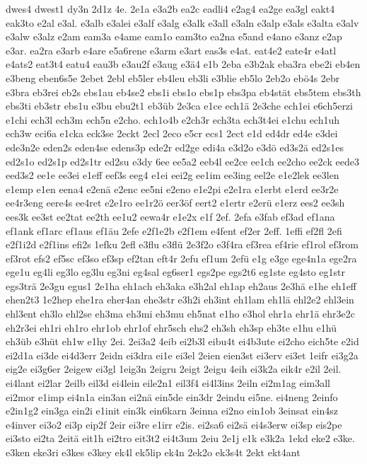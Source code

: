 {dwes4
dwest1
dy3n
2d1z
4e.
2e1a
e3a2b
ea2c
eadli4
e2ag4
ea2ge
ea3gl
eakt4
eak3to
e2al
e3al.
e3alb
e3alei
e3alf
e3alg
e3alk
e3all
e3aln
e3alp
e3als
e3alta
e3alv
e3alw
e3alz
e2am
eam3a
e4ame
eam1o
eam3to
ea2na
e5and
e4ano
e3anz
e2ap
e3ar.
ea2ra
e3arb
e4are
e5a6rene
e3arm
e3art
eas3s
e4at.
eat4e2
eate4r
e4atl
e4ats2
eat3t4
eatu4
eau3b
e3au2f
e3aug
e3ä4
e1b
2eba
e3b2ak
eba3ra
ebe2i
eb4en
e3beng
eben6s5e
2ebet
2ebl
eb5ler
eb4leu
eb3li
e3blie
eb5lo
2eb2o
ebö4s
2ebr
e3bra
eb3rei
eb2s
ebs1au
eb4se2
ebs1i
ebs1o
ebs1p
ebs3pa
eb4stät
ebs5tem
ebs3th
ebs3ti
eb3str
ebs1u
e3bu
ebu2t1
eb3üb
2e3ca
e1ce
ech1ä
2e3che
ech1ei
e6ch5erzi
e1chi
ech3l
ech3m
ech5n
e2cho.
ech1o4b
e2ch3r
ech3ta
ech3t4ei
e1chu
ech1uh
ech3w
eci6a
e1cka
eck3se
2eckt
2ecl
2eco
e5cr
ecs1
2ect
e1d
ed4dr
ed4e
e3dei
ede3n2e
eden2s
eden4se
edens3p
ede2r
ed2ge
edi4a
e3d2o
e3dö
ed3s2ä
ed2s1es
ed2s1o
ed2s1p
ed2s1tr
ed2su
e3dy
6ee
ee5a2
eeb4l
ee2ce
ee1ch
ee2cho
ee2ck
eede3
eed3s2
ee1e
ee3ei
e1eff
eef3s
eeg4
e1ei
eei2g
ee1im
ee3ing
eel2e
e1e2lek
ee3len
e1emp
e1en
eena4
e2enä
e2enc
ee5ni
e2eno
e1e2pi
e2e1ra
e1erbt
e1erd
ee3r2e
ee4r3eng
eere4s
ee4ret
e2e1ro
ee1r2ö
eer3öf
eert2
e1ertr
e2erü
e1erz
ees2
ee3sh
ees3k
ee3st
ee2tat
ee2th
ee1u2
eewa4r
e1e2x
e1f
2ef.
2efa
e3fab
ef3ad
ef1ana
ef1ank
ef1arc
ef1aus
ef1äu
2efe
e2f1e2b
e2f1em
e4fent
ef2er
2eff.
1effi
ef2fl
2efi
e2f1i2d
e2f1ins
efi2s
1efku
2efl
e3flu
e3flü
2e3f2o
e3f4ra
ef3rea
ef4rie
ef1rol
ef3rom
ef3rot
efs2
ef5sc
ef3so
ef3sp
ef2tan
eft4r
2efu
ef1um
2efü
e1g
e3ge
ege4n1a
ege2ra
ege1u
eg4li
eg3lo
eg3lu
eg3ni
eg4sal
eg6ser1
egs2pe
egs2t6
eg1ste
eg4sto
eg1str
egs3trä
2e3gu
egus1
2e1ha
eh1ach
eh3aka
e3h2al
eh1ap
eh2aus
2e3hä
e1he
eh1eff
ehen2t3
1e2hep
ehe1ra
eher4an
ehe3str
e3h2i
eh3int
eh1lam
eh1lä
ehl2e2
ehl3ein
ehl3ent
eh3lo
ehl2se
eh3ma
eh3mi
eh3mu
eh5nat
e1ho
e3hol
ehr1a
ehr1ä
ehr3e2c
eh2r3ei
eh1ri
eh1ro
ehr1ob
ehr1of
ehr5sch
ehs2
eh3sh
eh3sp
eh3te
e1hu
e1hü
eh3üb
e3hüt
eh1w
e1hy
2ei.
2ei3a2
4eib
ei2b3l
eibu4t
ei4b3ute
ei2cho
eich5te
e2id
ei2d1a
ei3de
ei4d3err
2eidn
ei3dra
ei1e
ei3el
2eien
eien3st
ei3erv
ei3et
1eifr
ei3g2a
eig2e
ei3g6er
2eigew
ei3gl
1eig3n
2eigru
2eigt
2eigu
4eih
ei3k2a
eik4r
e2il
2eil.
ei4lant
ei2lar
2eilb
eil3d
ei4lein
eile2n1
eil3f4
ei4l3ins
2eiln
ei2m1ag
eim3all
ei2mor
e1imp
ei4n1a
ein3an
ei2nä
ein5de
ein3dr
2eindu
ei5ne.
ei4neng
2einfo
e2in1g2
ein3ga
ein2i
e1init
ein3k
ein6karn
3einna
ei2no
ein1ob
3einsat
ein4sz
e4inver
ei3o2
ei3p
eip2f
2eir
ei3re
e1irr
e2is.
ei2sa6
ei2sä
ei4s3erw
ei3sp
eis2pe
ei3sto
ei2ta
2eitä
eit1h
ei2tro
eit3t2
ei4t3um
2eiu
2e1j
e1k
e3k2a
1ekd
eke2
e3ke.
e3ken
eke3ri
e3kes
e3key
ek4l
ek5lip
ek4n
2ek2o
ek3s4t
2ekt
ekt4ant
}
